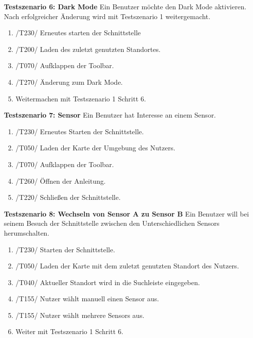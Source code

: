 \textbf{Testszenario 6: Dark Mode}
\newline
Ein Benutzer möchte den Dark Mode aktivieren. Nach erfolgreicher Änderung wird mit Testszenario 1 weitergemacht.
\begin{enumerate} [noitemsep]
    \item /T230/ Erneutes starten der Schnittstelle
    \item /T200/ Laden des zuletzt genutzten Standortes.
    \item /T070/ Aufklappen der \gls{Toolbar}.
    \item /T270/ Änderung zum Dark Mode.
    \item Weitermachen mit Testszenario 1 Schritt 6.
\end{enumerate}

\textbf{Testszenario 7:  Sensor}
\newline
Ein Benutzer hat Interesse an einem  Sensor.
\begin{enumerate} [noitemsep]
    \item /T230/ Erneutes Starten der Schnittstelle.
    \item /T050/ Laden der Karte der Umgebung des Nutzers.
    \item /T070/ Aufklappen der \gls{Toolbar}.
    \item /T260/ Öffnen der Anleitung.
    \item /T220/ Schließen der Schnittstelle.
\end{enumerate}

\textbf{Testszenario 8: Wechseln von Sensor A zu Sensor B}
\newline
Ein Benutzer will bei seinem Besuch der Schnittstelle zwischen den Unterschiedlichen \glspl{Sensor} herumschalten. 
\begin{enumerate} [noitemsep]
    \item /T230/ Starten der Schnittstelle.
    \item /T050/ Laden der Karte mit dem zuletzt genutzten Standort des Nutzers.
    \item /T040/ Aktueller Standort wird in die Suchleiste eingegeben.
    \item /T155/ Nutzer wählt manuell einen Sensor aus.
    \item /T155/ Nutzer wählt mehrere \glspl{Sensor} aus.
    \item Weiter mit Testszenario 1 Schritt 6.
\end{enumerate}

